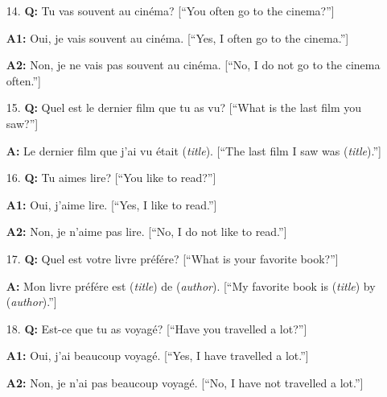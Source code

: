 \documentclass{article}
\theoremstyle{definition}
\theoremstyle{remark}
\theoremstyle{definition}
\begin{document}
\begin{enumerate}[leftmargin=*]
        \item[14.]\textbf{Q:} Tu vas souvent au cin\'ema? [``You often go to the cinema?'']\par 
            \noindent\textbf{A1:} Oui, je vais souvent au cin\'ema. [``Yes, I often go to the cinema.'']\par 
            \noindent\textbf{A2:} Non, je ne vais pas souvent au cin\'ema. [``No, I do not go to the cinema often.'']\par \vspace{3mm}
            \hline
            
        \item[15.]\textbf{Q:} Quel est le dernier film que tu as vu? [``What is the last film you saw?'']\par 
            \noindent\textbf{A:} Le dernier film que j'ai vu \'etait (\textit{title}). [``The last film I saw was (\textit{title}).'']\par \vspace{3mm}
            \hline
            
        \item[16.]\textbf{Q:} Tu aimes lire? [``You like to read?'']\par 
            \noindent\textbf{A1:} Oui, j'aime lire. [``Yes, I like to read.'']\par 
            \noindent\textbf{A2:} Non, je n'aime pas lire. [``No, I do not like to read.'']\par \vspace{3mm}
            \hline
            
        \item[17.]\textbf{Q:} Quel est votre livre pr\'ef\'ere? [``What is your favorite book?'']\par 
            \noindent\textbf{A:} Mon livre pr\'ef\'ere est (\textit{title}) de (\textit{author}). [``My favorite book is (\textit{title}) by (\textit{author}).'']\par \vspace{3mm}
            \hline
            
        \item[18.]\textbf{Q:} Est-ce que tu as voyag\'e? [``Have you travelled a lot?'']\par 
            \noindent\textbf{A1:} Oui, j'ai beaucoup voyag\'e. [``Yes, I have travelled a lot.'']\par 
            \noindent\textbf{A2:} Non, je n'ai pas beaucoup voyag\'e. [``No, I have not travelled a lot.'']\par \vspace{3mm}
            \hline
            

\end{enumerate}
\end{document}
